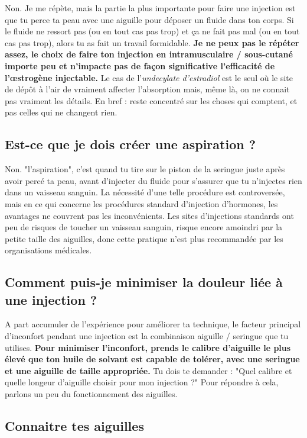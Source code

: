 \documentclass{article}
\begin{document}
Non. Je me répète, mais la partie la plus importante pour faire une injection est que tu perce ta peau avec une aiguille pour déposer un fluide dans ton corps. Si le fluide ne ressort pas (ou en tout cas pas trop) et ça ne fait pas mal (ou en tout cas pas trop), alors tu as fait un travail formidable. \textbf{Je ne peux pas le répéter assez, le choix de faire ton injection en intramusculaire / sous-cutané importe peu et n'impacte pas de façon significative l'efficacité de l'œstrogène injectable. } Le cas de l'\textit{undecylate d'estradiol} est le seul où le site de dépôt à l'air de vraiment affecter l'absorption mais, même là, on ne connait pas vraiment les détails. En bref : reste concentré sur les choses qui comptent, et pas celles qui ne changent rien.

\subsection{Est-ce que je dois créer une aspiration ?}

Non. "l'aspiration", c'est quand tu tire sur le piston de la seringue juste après avoir percé ta peau, avant d'injecter du fluide pour s'assurer que tu n'injectes rien dans un vaisseau sanguin. La nécessité d'une telle procédure est controversée, mais en ce qui concerne les procédures standard d'injection d'hormones, les avantages ne couvrent pas les inconvénients. Les sites d'injections standards ont peu de risques de toucher un vaisseau sanguin, risque encore amoindri par la petite taille des aiguilles, donc cette pratique n'est plus recommandée par les organisations médicales.

\subsection{Comment puis-je minimiser la douleur liée à une injection ?}

A part accumuler de l'expérience pour améliorer ta technique, le facteur principal d'inconfort pendant une injection est la combinaison aiguille / seringue que tu utilises. \textbf{Pour minimiser l'inconfort, prends le calibre d'aiguille le plus élevé que ton huile de solvant est capable de tolérer, avec une seringue et une aiguille de taille appropriée.} Tu dois te demander : "Quel calibre et quelle longeur d'aiguille choisir pour mon injection ?" Pour répondre à cela, parlons un peu du fonctionnement des aiguilles.

\subsection*{Connaitre tes aiguilles}
\end{document}
